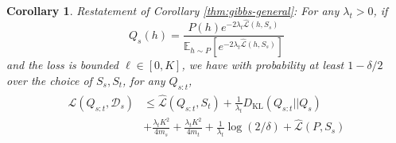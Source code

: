 \documentclass{article}
\theoremstyle{plain}
\newtheorem{corollary}[theorem]{Corollary}
\theoremstyle{definition}
\theoremstyle{remark}
\begin{document}
\begin{corollary} Restatement of Corollary \ref{thm:gibbs-general}:
For any $\lambda_t>0$, if $$Q_s(h)=\frac{P(h)e^{-2\lambda_t\hat{\mathcal{L}}(h,S_s)}}{\mathbb{E}_{h\sim P}\left [e^{-2\lambda_t\hat{\mathcal{L}}(h,S_s)} \right ]}$$ and the loss is bounded $\ell\in[0,K]$, 
we have with probability at least $1-\delta/2$ over the choice of $S_s,S_t$, for any $Q_{s:t}$, 
%
\begin{align}
\begin{split}
\mathcal{L}(Q_{s:t}, \mathcal{D}_s) &\leq \hat{\mathcal{L}}(Q_{s:t}, S_t) + \frac{1}{\lambda_t} D_{\mathrm{KL}}(Q_{s:t}||Q_{s})\\
&+\frac{\lambda_t K^2}{4m_s}+\frac{\lambda_t K^2}{4m_t}+\frac{1}{\lambda_t}\log(2/\delta)+ \hat{\mathcal{L}}(P, S_s)
\end{split}
\end{align}
\end{corollary}
\end{document}
